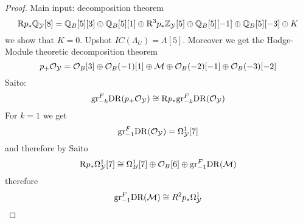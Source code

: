 \documentclass[12pt]{article}
\renewcommand{\gr}{\mathrm{gr}}
\newcommand{\R}{\mathrm{R}}
\begin{document}
\begin{proof}
Main input: decomposition theorem
\[ \R p_* \Q_{\cY}[8] = \Q_B [5][3] \oplus \Q_B[5][1] \oplus \R^3 p_* \Z_{\cY}[5] \oplus \Q_B[5][-1] \oplus \Q_B[5][-3] \oplus K \]
we show that $K = 0$. Upshot $IC(\Lambda_U) = \Lambda[5]$. Moreover we get the Hodge-Module theoretic decomposition theorem
\[ p_+ \mathcal{O}_{\mathcal{Y}} = \mathcal{O}_{B}[3] \oplus \mathcal{O}_{B}(-1) [1] \oplus \mathcal{M} \oplus \mathcal{O}_{B}(-2)[-1] \oplus \mathcal{O}_{B}(-3)[-2] \]
Saito: 
\[ \gr^F_{-k} \DR(p_+ \struct{\cY}) \cong \R p_* \gr^F_{-k} \DR(\struct{\cY}) \]
For $k = 1$ we get
\[ \gr_{-1}^F \DR(\struct{\cY}) = \Omega_{\cY}^1[7] \]
and therefore by Saito
\[ \R p_* \Omega_{\cY}^1[7] \cong \Omega_B^1[7] \oplus \struct{B}[6] \oplus \gr^F_{-1} \DR(\M) \]
therefore
\[ \gr^F_{-1} \DR(\M) \cong R^2 p_* \Omega^1_{\cY} \]
\end{proof}
\end{document}
